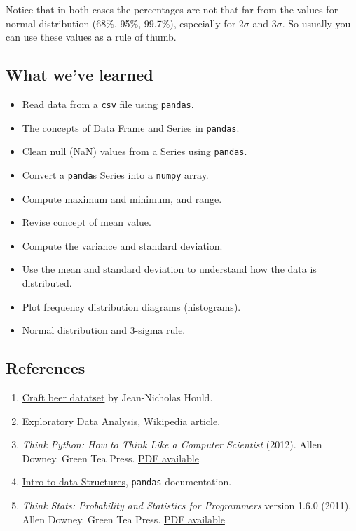 \documentclass[11pt]{article}
\providecommand{\tightlist}{%
      \setlength{\itemsep}{0pt}\setlength{\parskip}{0pt}}
\begin{document}
    Notice that in both cases the percentages are not that far from the
values for normal distribution (68\%, 95\%, 99.7\%), especially for
\(2\sigma\) and \(3\sigma\). So usually you can use these values as a
rule of thumb.

    \subsection{What we've learned}\label{what-weve-learned}

\begin{itemize}
\tightlist
\item
  Read data from a \texttt{csv} file using \texttt{pandas}.
\item
  The concepts of Data Frame and Series in \texttt{pandas}.
\item
  Clean null (NaN) values from a Series using \texttt{pandas}.
\item
  Convert a \texttt{panda}s Series into a \texttt{numpy} array.
\item
  Compute maximum and minimum, and range.
\item
  Revise concept of mean value.
\item
  Compute the variance and standard deviation.
\item
  Use the mean and standard deviation to understand how the data is
  distributed.
\item
  Plot frequency distribution diagrams (histograms).
\item
  Normal distribution and 3-sigma rule.
\end{itemize}

    \subsection{References}\label{references}

\begin{enumerate}
\def\labelenumi{\arabic{enumi}.}
\tightlist
\item
  \href{https://github.com/nickhould/craft-beers-dataset}{Craft beer
  datatset} by Jean-Nicholas Hould.
\item
  \href{https://en.wikipedia.org/wiki/Exploratory_data_analysis}{Exploratory
  Data Analysis}, Wikipedia article.
\item
  \emph{Think Python: How to Think Like a Computer Scientist} (2012).
  Allen Downey. Green Tea Press.
  \href{http://greenteapress.com/thinkpython/thinkpython.pdf}{PDF
  available}
\item
  \href{https://pandas.pydata.org/pandas-docs/stable/dsintro.html}{Intro
  to data Structures}, \texttt{pandas} documentation.
\item
  \emph{Think Stats: Probability and Statistics for Programmers} version
  1.6.0 (2011). Allen Downey. Green Tea Press.
  \href{http://greenteapress.com/thinkstats/thinkstats.pdf}{PDF
  available}
\end{enumerate}
\end{document}
